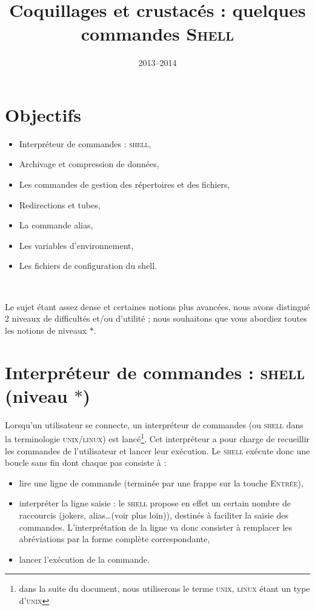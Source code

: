 \documentclass[a4paper,11pt]{article}
\title{Coquillages et crustacés : quelques commandes \textsc{Shell}}
\date{2013--2014}
\newcommand{\unix}{\textsc{unix}}
\newcommand{\linux}{\textsc{linux}}
\newcommand{\shell}{\textsc{shell}}
\begin{document}
\maketitle

\section*{Objectifs}
\begin{itemize}
  \item Interpréteur de commandes :  \shell,
  \item Archivage et compression de données,
  \item Les commandes de gestion des répertoires et des fichiers,
  \item Redirections et tubes,
  \item La commande alias,
  \item Les variables d'environnement,
  \item Les fichiers de configuration du shell.
\end{itemize}

\

\begin{danger}
  Le sujet étant assez dense et certaines notions plus avancées, nous avons
  distingué 2 niveaux de difficultés et/ou d'utilité ;
  nous souhaitons que vous abordiez toutes les notions de niveaux $*$.
\end{danger}

\section{Interpréteur de commandes :  \shell \; (niveau $*$)}

Lorsqu'un utilisateur se connecte, un interpréteur de commandes (ou
\shell{} dans la terminologie \unix/\linux)
est lancé\footnote{dans la suite du document, nous utiliserons le terme
\unix, \linux{} étant un type d'\unix}.
Cet interpréteur a pour charge de recueillir les commandes de l'utilisateur
et lancer leur exécution.
Le  \shell{} exécute donc une boucle sans fin dont chaque pas consiste
à :
\begin{itemize}
  \item lire une ligne de commande (terminée par une frappe sur la touche
        \textsc{Entrée}),
  \item interpréter la ligne saisie : le \shell{} propose en effet un certain
        nombre de raccourcis (jokers, alias\ldots (voir plus loin)), destinés
        à faciliter la saisie des commandes. L'interprétation de la ligne va
        donc consister à remplacer les abréviations par la forme complète
        correspondante,
  \item lancer l'exécution de la commande.
\end{itemize}
\end{document}
